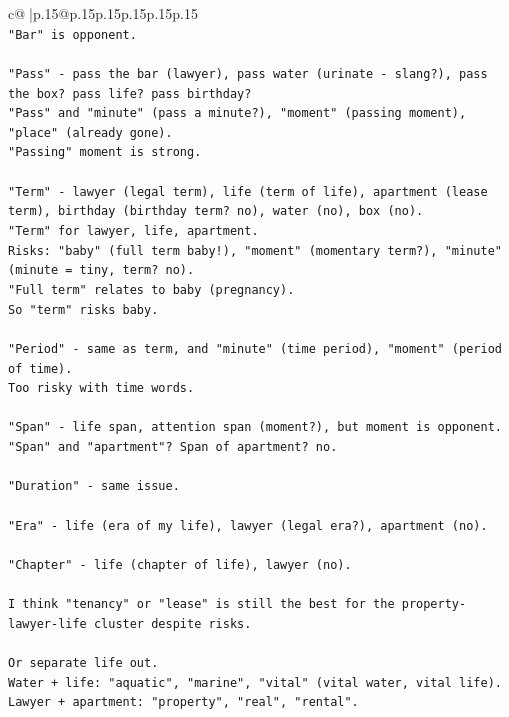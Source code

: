 \documentclass{article}
\begin{document}
{\begin{supertabular}{c@{$\;$}|p{.15\linewidth}@{}p{.15\linewidth}p{.15\linewidth}p{.15\linewidth}p{.15\linewidth}p{.15\linewidth}}
{{{\\ 
\texttt{"Bar" is opponent.} \\
\\ 
\texttt{"Pass" {-} pass the bar (lawyer), pass water (urinate {-} slang?), pass the box? pass life? pass birthday?} \\
\texttt{"Pass" and "minute" (pass a minute?), "moment" (passing moment), "place" (already gone).} \\
\texttt{"Passing" moment is strong.} \\
\\ 
\texttt{"Term" {-} lawyer (legal term), life (term of life), apartment (lease term), birthday (birthday term? no), water (no), box (no).} \\
\texttt{"Term" for lawyer, life, apartment.} \\
\texttt{Risks: "baby" (full term baby!), "moment" (momentary term?), "minute" (minute = tiny, term? no).} \\
\texttt{"Full term" relates to baby (pregnancy).} \\
\texttt{So "term" risks baby.} \\
\\ 
\texttt{"Period" {-} same as term, and "minute" (time period), "moment" (period of time).} \\
\texttt{Too risky with time words.} \\
\\ 
\texttt{"Span" {-} life span, attention span (moment?), but moment is opponent.} \\
\texttt{"Span" and "apartment"? Span of apartment? no.} \\
\\ 
\texttt{"Duration" {-} same issue.} \\
\\ 
\texttt{"Era" {-} life (era of my life), lawyer (legal era?), apartment (no).} \\
\\ 
\texttt{"Chapter" {-} life (chapter of life), lawyer (no).} \\
\\ 
\texttt{I think "tenancy" or "lease" is still the best for the property{-}lawyer{-}life cluster despite risks.} \\
\\ 
\texttt{Or separate life out.} \\
\texttt{Water + life: "aquatic", "marine", "vital" (vital water, vital life).} \\
\texttt{Lawyer + apartment: "property", "real", "rental".} \\
}}}
\end{supertabular}}
\end{document}
